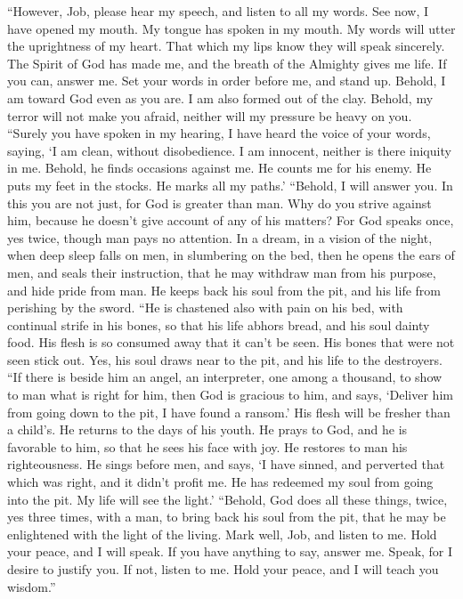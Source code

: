  ``However, Job, please hear my speech, and listen to all
my words.  See now, I have opened my mouth. My tongue has
spoken in my mouth.  My words will utter the uprightness
of my heart. That which my lips know they will speak sincerely.
 The Spirit of God has made me, and the breath of the
Almighty gives me life.  If you can, answer me. Set your
words in order before me, and stand up.  Behold, I am
toward God even as you are. I am also formed out of the clay.
 Behold, my terror will not make you afraid, neither will
my pressure be heavy on you.  ``Surely you have spoken in
my hearing, I have heard the voice of your words, saying, 
`I am clean, without disobedience. I am innocent, neither is there
iniquity in me.  Behold, he finds occasions against me.
He counts me for his enemy.  He puts my feet in the
stocks. He marks all my paths.'  ``Behold, I will answer
you. In this you are not just, for God is greater than man.
 Why do you strive against him, because he doesn't give
account of any of his matters?  For God speaks once, yes
twice, though man pays no attention.  In a dream, in a
vision of the night, when deep sleep falls on men, in slumbering on the
bed,  then he opens the ears of men, and seals their
instruction,  that he may withdraw man from his purpose,
and hide pride from man.  He keeps back his soul from the
pit, and his life from perishing by the sword.  ``He is
chastened also with pain on his bed, with continual strife in his bones,
 so that his life abhors bread, and his soul dainty food.
 His flesh is so consumed away that it can't be seen. His
bones that were not seen stick out.  Yes, his soul draws
near to the pit, and his life to the destroyers.  ``If
there is beside him an angel, an interpreter, one among a thousand, to
show to man what is right for him,  then God is gracious
to him, and says, `Deliver him from going down to the pit, I have found
a ransom.'  His flesh will be fresher than a child's. He
returns to the days of his youth.  He prays to God, and
he is favorable to him, so that he sees his face with joy. He restores
to man his righteousness.  He sings before men, and says,
`I have sinned, and perverted that which was right, and it didn't profit
me.  He has redeemed my soul from going into the pit. My
life will see the light.'  ``Behold, God does all these
things, twice, yes three times, with a man,  to bring
back his soul from the pit, that he may be enlightened with the light of
the living.  Mark well, Job, and listen to me. Hold your
peace, and I will speak.  If you have anything to say,
answer me. Speak, for I desire to justify you.  If not,
listen to me. Hold your peace, and I will teach you wisdom.''

